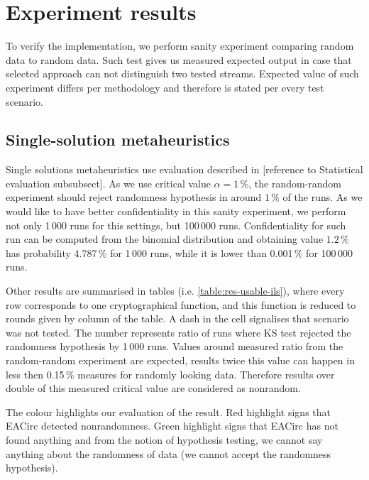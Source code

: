 \documentclass[
  print, %
  Table,   %
  nolof,     %
  nolot,     %
  11pt, %
  oneside  %
]{fithesis3}
\begin{document}
\chapter{Experiment results}
\label{chap:res}

To verify the implementation, we perform sanity experiment comparing random data to random data. Such test gives us measured expected output in case that selected approach can not distinguish two tested streams. Expected value of such experiment differs per methodology and therefore is stated per every test scenario.

\section{Single-solution metaheuristics}
\label{sec:res-ss}


Single solutions metaheuristics use evaluation described in [reference to Statistical evaluation subsubsect]. As we use critical value $\alpha=1\,\%$, the random-random experiment should reject randomness hypothesis in around $1\,\%$ of the runs. As we would like to have better confidentiality in this sanity experiment, we perform not only 1\,000 runs for this settings, but 100\,000 runs. Confidentiality for such run can be computed from the binomial distribution and obtaining value $1.2\,\%$ has probability 4.787\,\% for 1\,000 runs, while it is lower than 0.001\,\% for 100\,000 runs.

Other results are summarised in tables (i.e. \cref{table:res-usable-ils}), where every row corresponds to one cryptographical function, and this function is reduced to rounds given by column of the table. A dash in the cell signalises that scenario was not tested. The number represents ratio of runs where KS test rejected the randomness hypothesis by 1\,000 runs. Values around measured ratio from the random-random experiment are expected, results twice this value can happen in less then 0.15\,\% measures for randomly looking data. Therefore results over double of this measured critical value are considered as nonrandom.

The colour highlights our evaluation of the result. Red highlight signs that EACirc detected nonrandomness. Green highlight signs that EACirc has not found anything and from the notion of hypothesis testing, we cannot say anything about the randomness of data (we cannot accept the randomness hypothesis).
\end{document}
